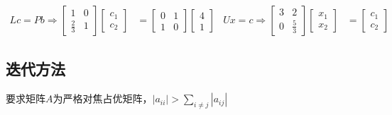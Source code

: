 \documentclass[twocolumn]{article}
\begin{document}
\begin{align*}
    Lc=Pb\Rightarrow
    \begin{bmatrix}
        1           & 0 \\
        \frac{2}{3} & 1
    \end{bmatrix}
    \begin{bmatrix}
        c_1 \\
        c_2
    \end{bmatrix}
    &=
    \begin{bmatrix}
        0 & 1 \\
        1 & 0
    \end{bmatrix}
    \begin{bmatrix}
        4 \\
        1
    \end{bmatrix}
    &
    Ux=c \Rightarrow
    \begin{bmatrix}
        3 & 2           \\
        0 & \frac{5}{3}
    \end{bmatrix}
    \begin{bmatrix}
        x_1 \\
        x_2
    \end{bmatrix}
    &=
    \begin{bmatrix}
        c_1 \\
        c_2
    \end{bmatrix}
\end{align*}

\subsection{迭代方法}
要求矩阵$A$为严格对焦占优矩阵，$|a_{ii}|>\sum_{i\neq j}|a_{ij}|$
\end{document}
